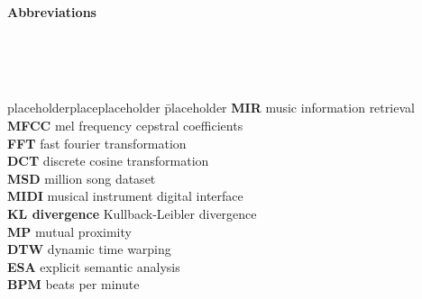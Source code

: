 \documentclass[a4paper,oneside,12pt]{report}
\begin{document}
\begin{flushleft}
\begin{Huge}
\textbf{Abbreviations}
\end{Huge}
\end{flushleft}

\ \\
\ \\
\ \\

\begin{tabbing}
placeholderplaceplaceholder \= placeholder \kill
\textbf{MIR} \> music information retrieval\\
\textbf{MFCC} \> mel frequency cepstral coefficients\\
\textbf{FFT} \> fast fourier transformation\\
\textbf{DCT} \> discrete cosine transformation\\
\textbf{MSD} \> million song dataset\\
\textbf{MIDI} \> musical instrument digital interface\\
\textbf{KL divergence} \> Kullback-Leibler divergence\\
\textbf{MP} \> mutual proximity\\
\textbf{DTW} \> dynamic time warping\\
\textbf{ESA} \> explicit semantic analysis\\
\textbf{BPM} \> beats per minute\\



\end{tabbing}


\newpage
{}
{}
\listoffigures




\cleardoublepage
\newpage
{}
{}
\listoftables
\ \\ 
\ \\ 
\end{document}
